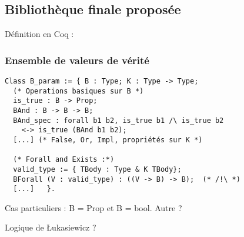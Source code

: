 \documentclass{beamer}
\newcommand\code[1]{{\fontfamily{lmtt}\selectfont #1}}
\begin{document}
\subsection{Bibliothèque finale proposée}


\begin{frame}[fragile]

Définition en Coq :

\frametitle{Ensemble de valeurs de vérité}
\begin{lstlisting}[frame=single, language = Coq, basicstyle=\scriptsize]
Class B_param := { B : Type; K : Type -> Type;
  (* Operations basiques sur B *)
  is_true : B -> Prop;
  BAnd : B -> B -> B;
  BAnd_spec : forall b1 b2, is_true b1 /\ is_true b2 
  	<-> is_true (BAnd b1 b2);
  [...] (* False, Or, Impl, propriétés sur K *)

  (* Forall and Exists :*)
  valid_type := { TBody : Type & K TBody};
  BForall (V : valid_type) : ((V -> B) -> B);  (* /!\ *)
  [...]   }.
\end{lstlisting}

Cas particuliers : \code{B = Prop} et \code{B = bool}. Autre ? 

Logique de Łukasiewicz ?


\end{frame}
\end{document}
